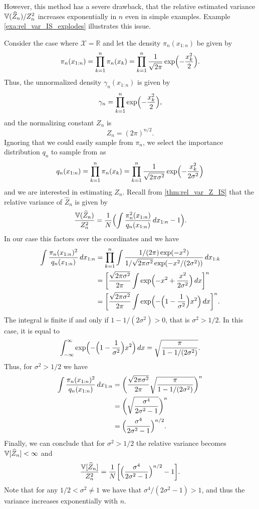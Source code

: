 However, this method has a severe drawback, that the relative estimated variance $\operatorname{\mathbb{V}}(\widehat{Z}_n)/Z_n^2$ increases exponentially in $n$ even in simple examples. Example \ref{exa:rel_var_IS_explodes} illustrates this issue.
\begin{example}\label{exa:rel_var_IS_explodes}
	Consider the case where $\mathcal{X}=\mathbb{R}$ and let the density $\pi_n(x_{1:n})$ be given by
	\[
	\pi_n(x_{1:n})=\prod_{k=1}^n \pi_n(x_k)=\prod_{k=1}^n \frac{1}{\sqrt{2\pi}}\exp\Bigl(-\frac{x_k^2}{2}\Bigr).
	\]
	Thus, the unnormalized density $\gamma_n(x_{1:n})$ is given by
	\[
	\gamma_n=\prod_{k=1}^n \exp\Bigl(-\frac{x_k^2}{2}\Bigr),
	\]
	and the normalizing constant $Z_n$ is
	\[
	Z_n=(2\pi)^{n/2}.
	\]
	Ignoring that we could easily sample from $\pi_n$, we select the importance distribution $q_n$ to sample from as
	\[q_n(x_{1:n})=\prod_{k=1}^n \pi_n(x_k)=\prod_{k=1}^n \frac{1}{\sqrt{2\pi\sigma^2}}\exp\Bigl(-\frac{x_k^2}{2\sigma^2}\Bigr)\]
	and we are interested in estimating $Z_n$. Recall from \cref{thm:rel_var_Z_IS} that the relative variance of $\widehat{Z}_n$ is given by
	\[
	\frac{\operatorname{\mathbb{V}}(\widehat{Z}_n)}{Z_n^2}=\frac{1}{N}\Bigl(\int \frac{\pi_n^2(x_{1:n})}{q_n(x_{1:n})}\, dx_{1:n}-1\Bigr).
	\]
	In our case this factors over the coordinates and we have
	\begin{align*}
		\int \frac{\pi_n(x_{1:n})^2}{q_n(x_{1:n})}\, dx_{1:n}&=\prod_{k=1}^{n}\int \frac{1/(2\pi)\exp(-x^2)}{1/\sqrt{2\pi\sigma^2}\exp(-x^2/(2\sigma^2))}\, dx_{1:k} \\
		&=\biggl[\frac{\sqrt{2\pi\sigma^2}}{2\pi}\int \exp\Bigl(-x^2+\frac{x^2}{2\sigma^2}\Bigr)\, dx \biggr]^n \\
		&=\biggl[\frac{\sqrt{2\pi\sigma^2}}{2\pi}\int \exp\Bigl(-\Bigl(1-\frac{1}{\sigma^2}\Bigr)x^2\Bigr)\, dx \biggr]^n.
	\end{align*}
	The integral is finite if and only if $1-1/(2\sigma^2)>0$, that is $\sigma^2>1/2$. In this case, it is equal to 
	\[
	\int_{-\infty}^{\infty} \exp\Bigl(-\Bigl(1-\frac{1}{\sigma^2}\Bigr)x^2\Bigr)\, dx=\sqrt{\frac{\pi}{1-1/(2\sigma^2)}}.
	\]
	Thus, for $\sigma^2>1/2$ we have
	\begin{align*}
		\int \frac{\pi_n(x_{1:n})^2}{q_n(x_{1:n})}\, dx_{1:n} &=\biggl(\frac{\sqrt{2\pi\sigma^2}}{2\pi} \sqrt{\frac{\pi}{1-1/(2\sigma^2)}}\biggr)^n \\
		&=\biggl(\sqrt{\frac{\sigma^4}{2\sigma^2-1}}\biggr)^n \\
		&=\Bigl(\frac{\sigma^4}{2\sigma^2-1}\Bigr)^{n/2}.
	\end{align*}
	Finally, we can conclude that for $\sigma^2>1/2$ the relative variance becomes $\operatorname{\mathbb{V}}[\widehat{Z}_n]<\infty$ and 
	\[
	\frac{\operatorname{\mathbb{V}}[\widehat{Z}_n]}{Z_n^2}=\frac{1}{N}\biggl[\Bigl(\frac{\sigma^4}{2\sigma^2-1}\Bigr)^{n/2}-1\biggr].
	\]
	Note that for any $1/2<\sigma^2\neq 1$ we have that $\sigma^4/(2\sigma^2-1)>1$, and thus the variance increases exponentially with $n$. 
	

\end{example}
